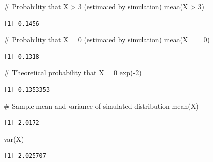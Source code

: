 \documentclass[
  letterpaper,
  DIV=11,
  numbers=noendperiod]{scrreprt}
\newenvironment{Shaded}{\begin{snugshade}}{\end{snugshade}}
\newcommand{\CommentTok}[1]{\textcolor[rgb]{0.37,0.37,0.37}{#1}}
\newcommand{\DecValTok}[1]{\textcolor[rgb]{0.68,0.00,0.00}{#1}}
\newcommand{\FunctionTok}[1]{\textcolor[rgb]{0.28,0.35,0.67}{#1}}
\newcommand{\NormalTok}[1]{\textcolor[rgb]{0.00,0.23,0.31}{#1}}
\newcommand{\SpecialCharTok}[1]{\textcolor[rgb]{0.37,0.37,0.37}{#1}}
\begin{document}
\begin{Shaded}
\begin{Highlighting}[]
\CommentTok{\# Probability that X \textgreater{} 3 (estimated by simulation)}
\FunctionTok{mean}\NormalTok{(X }\SpecialCharTok{\textgreater{}} \DecValTok{3}\NormalTok{)}
\end{Highlighting}
\end{Shaded}

\begin{verbatim}
[1] 0.1456
\end{verbatim}

\begin{Shaded}
\begin{Highlighting}[]
\CommentTok{\# Probability that X = 0 (estimated by simulation)}
\FunctionTok{mean}\NormalTok{(X }\SpecialCharTok{==} \DecValTok{0}\NormalTok{)}
\end{Highlighting}
\end{Shaded}

\begin{verbatim}
[1] 0.1318
\end{verbatim}

\begin{Shaded}
\begin{Highlighting}[]
\CommentTok{\# Theoretical probability that X = 0}
\FunctionTok{exp}\NormalTok{(}\SpecialCharTok{{-}}\DecValTok{2}\NormalTok{)}
\end{Highlighting}
\end{Shaded}

\begin{verbatim}
[1] 0.1353353
\end{verbatim}

\begin{Shaded}
\begin{Highlighting}[]
\CommentTok{\# Sample mean and variance of simulated distribution}
\FunctionTok{mean}\NormalTok{(X)}
\end{Highlighting}
\end{Shaded}

\begin{verbatim}
[1] 2.0172
\end{verbatim}

\begin{Shaded}
\begin{Highlighting}[]
\FunctionTok{var}\NormalTok{(X)}
\end{Highlighting}
\end{Shaded}

\begin{verbatim}
[1] 2.025707
\end{verbatim}
\end{document}
